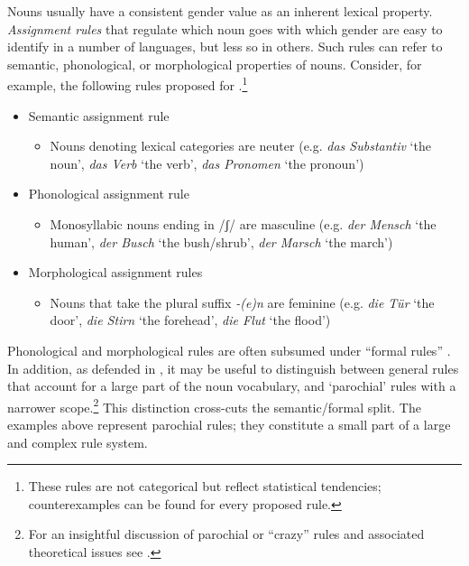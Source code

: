 \documentclass[output=collectionpaper]{langsci/langscibook}
\begin{document}
Nouns usually have a consistent gender value as an inherent lexical property. \textit{Assignment rules} that regulate which noun goes with which gender are easy to identify in a number of languages, but less so in others. Such rules can refer to semantic, phonological, or morphological properties of nouns. Consider, for example, the following rules proposed for  \citep[Chapter~3]{Koepcke1982}.\footnote{These rules are not categorical but reflect statistical tendencies; counterexamples can be found for every proposed rule.}

\begin{itemize}
\item Semantic assignment rule

\begin{itemize}
\item Nouns denoting lexical categories are neuter (e.g. \textit{das Substantiv} `the noun', \textit{das Verb} `the verb', \textit{das Pronomen} `the pronoun')
\end{itemize}

\item Phonological assignment rule

\begin{itemize}
\item Monosyllabic nouns ending in /ʃ/ are masculine (e.g. \textit{der Mensch} `the human', \textit{der Busch} `the bush/shrub', \textit{der Marsch} `the march')
\end{itemize}

\item Morphological assignment rules

\begin{itemize}
\item Nouns that take the plural suffix \textit{{}-(e)n} are feminine (e.g. \textit{die Tür} `the door', \textit{die Stirn} `the forehead', \textit{die Flut} `the flood')
\end{itemize}
\end{itemize}

Phonological and morphological rules are often subsumed under ``formal rules'' \citep{Corbett2013b}. In addition, as defended in \citet{Audring2017}, it may be useful to distinguish between general rules that account for a large part of the noun vocabulary, and `parochial' rules with a narrower scope.\footnote{For an insightful discussion of parochial or ``crazy'' rules and associated theoretical issues see \citet{Enger2009}.} This distinction cross-cuts the semantic/formal split. The  examples above represent parochial rules; they constitute a small part of a large and complex rule system.
\end{document}
